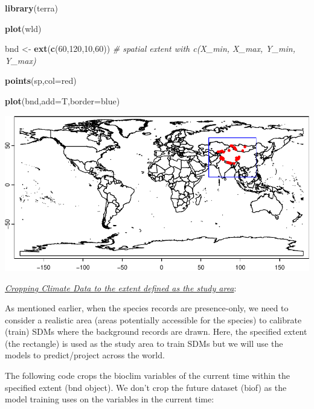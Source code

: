\documentclass[
]{article}
\newenvironment{Shaded}{\begin{snugshade}}{\end{snugshade}}
\newcommand{\AttributeTok}[1]{\textcolor[rgb]{0.13,0.29,0.53}{#1}}
\newcommand{\CommentTok}[1]{\textcolor[rgb]{0.56,0.35,0.01}{\textit{#1}}}
\newcommand{\DecValTok}[1]{\textcolor[rgb]{0.00,0.00,0.81}{#1}}
\newcommand{\FunctionTok}[1]{\textcolor[rgb]{0.13,0.29,0.53}{\textbf{#1}}}
\newcommand{\NormalTok}[1]{#1}
\newcommand{\OtherTok}[1]{\textcolor[rgb]{0.56,0.35,0.01}{#1}}
\newcommand{\StringTok}[1]{\textcolor[rgb]{0.31,0.60,0.02}{#1}}
\begin{document}
\begin{Shaded}
\begin{Highlighting}[]
\FunctionTok{library}\NormalTok{(terra)}

\FunctionTok{plot}\NormalTok{(wld)}

\NormalTok{bnd }\OtherTok{\textless{}{-}} \FunctionTok{ext}\NormalTok{(}\FunctionTok{c}\NormalTok{(}\DecValTok{60}\NormalTok{,}\DecValTok{120}\NormalTok{,}\DecValTok{10}\NormalTok{,}\DecValTok{60}\NormalTok{)) }\CommentTok{\# spatial extent with c(X\_min, X\_max, Y\_min, Y\_max)}

\FunctionTok{points}\NormalTok{(sp,}\AttributeTok{col=}\StringTok{\textquotesingle{}red\textquotesingle{}}\NormalTok{)}

\FunctionTok{plot}\NormalTok{(bnd,}\AttributeTok{add=}\NormalTok{T,}\AttributeTok{border=}\StringTok{\textquotesingle{}blue\textquotesingle{}}\NormalTok{)}
\end{Highlighting}
\end{Shaded}

\includegraphics{sdm_R_files/figure-latex/unnamed-chunk-3-1.pdf}

\uline{\textit{Cropping Climate Data to the extent defined as the study area}}:

As mentioned earlier, when the species records are presence-only, we
need to consider a realistic area (areas potentially accessible for the
species) to calibrate (train) SDMs where the background records are
drawn. Here, the specified extent (the rectangle) is used as the study
area to train SDMs but we will use the models to predict/project across
the world.

The following code crops the bioclim variables of the current time
within the specified extent (bnd object). We don't crop the future
dataset (biof) as the model training uses on the variables in the
current time:
\end{document}
